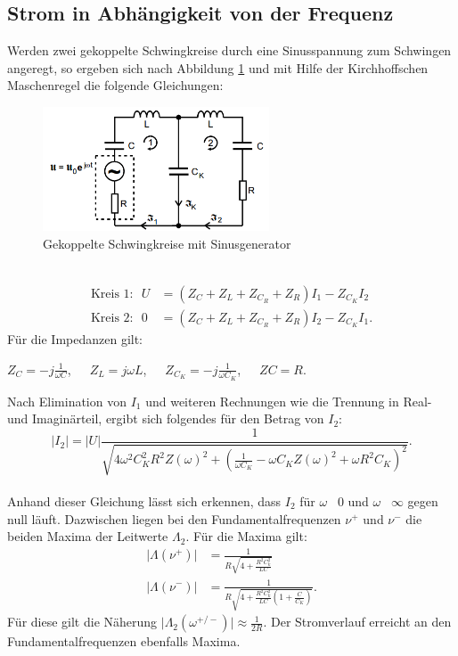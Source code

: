   \subsection{Strom in Abhängigkeit von der Frequenz}
  Werden zwei gekoppelte Schwingkreise durch eine Sinusspannung zum Schwingen angeregt, so ergeben sich nach Abbildung \ref{abb:schaltbildsinus} und mit Hilfe der Kirchhoffschen Maschenregel die folgende Gleichungen:
  \begin{figure}
    \centering
    \includegraphics[width=0.6\textwidth]{SchaltbildSinus.PNG}
    \caption{Gekoppelte Schwingkreise mit Sinusgenerator\cite{skript}}
    \label{abb:schaltbildsinus}
    \end{figure}\\
  \begin{align}
    \text{Kreis 1:}\ \ \ U&=(Z_C+Z_L+Z_{C_R}+Z_R)I_1-Z_{C_K}I_2\\
    \text{Kreis 2:}\ \ \ 0&=(Z_C+Z_L+Z_{C_R}+Z_R)I_2-Z_{C_K}I_1.
  \end{align}
Für die Impedanzen gilt:\\
\begin{center}$Z_C=-j\frac{1}{\omega C}$,\ \ \ $Z_L=j\omega L $,\ \ \ $Z_{C_K}=-j\frac{1}{\omega C_K}$,\ \ \ $ZC=R$.
\end{center}
Nach Elimination von $I_1$ und weiteren Rechnungen wie die Trennung in Real- und Imaginärteil, ergibt sich folgendes für den Betrag von $I_2$:\\
\begin{equation}
  \lvert I_2 \rvert = \lvert U \rvert \frac{1}{\sqrt{4\omega^{2}C_K^{2}R^{2}Z(\omega)^{2}+\left(\frac{1}{\omega C_K}-\omega C_KZ(\omega)^{2}+\omega R^{2}C_K\right)^{2}}}.
\end{equation}\\
Anhand dieser Gleichung lässt sich erkennen, dass $I_2$ für $\omega$ \textrightarrow \ 0 und $\omega$ \textrightarrow \ $\infty$ gegen null läuft.
Dazwischen liegen bei den Fundamentalfrequenzen $\nu^{+}$ und $\nu^{-}$ die beiden Maxima der Leitwerte $\Lambda_2$.
Für die Maxima gilt:\\
\begin{align}
 \lvert \Lambda(\nu^{+}) \rvert &= \frac{1}{R\sqrt{4+\frac{R^{2}C_k^{2}}{LC}}}\\
 \lvert \Lambda(\nu^{-}) \rvert &= \frac{1}{R\sqrt{4+\frac{R^{2}C_k^{2}}{LC}\left(1+\frac{C}{C_K}\right)}}.
\end{align}
Für diese gilt die Näherung $\lvert \Lambda_2(\omega^{+/-})\rvert\approx \frac{1}{2R} $.
Der Stromverlauf erreicht an den Fundamentalfrequenzen ebenfalls Maxima.
\newpage
